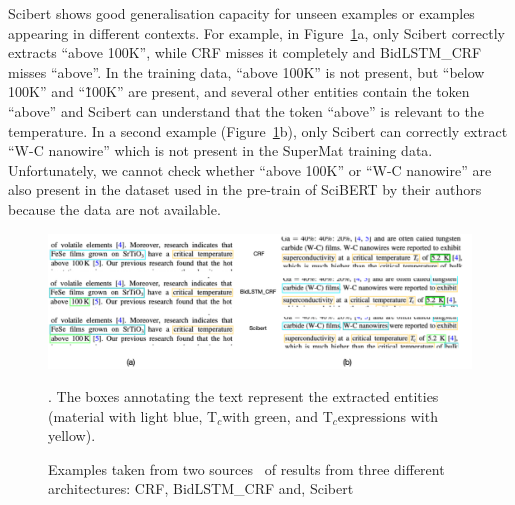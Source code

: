 \documentclass[]{interact}
\theoremstyle{plain}%
\theoremstyle{definition}
\theoremstyle{remark}
\newcommand{\tc}{T$_{c}$}
\begin{document}
Scibert shows good generalisation capacity for unseen examples or examples appearing in different contexts.
For example, in Figure~\ref{fig:example-comparison-architectures}a, only Scibert correctly extracts ``above 100K'', while CRF misses it completely and BidLSTM\_CRF misses ``above''.
In the training data, ``above 100K'' is not present, but ``below 100K'' and ``\~100K'' are present, and several other entities contain the token ``above'' and Scibert can understand that the token ``above'' is relevant to the temperature.
In a second example (Figure~\ref{fig:example-comparison-architectures}b), only Scibert can correctly extract ``W-C nanowire'' which is not present in the SuperMat training data.
Unfortunately, we cannot check whether ``above 100K'' or ``W-C nanowire'' are also present in the dataset used in the pre-train of SciBERT by their authors~\cite{Beltagy2019SciBERT} because the data are not available.

\begin{figure}[ht]
    \centering
    \includegraphics[width=\textwidth]{example-comparison-archs.png}
    \caption{Examples taken from two sources~\cite{Gajda_2016, Shibata_2016} of results from three different architectures: CRF, BidLSTM\_CRF and, Scibert}. The boxes annotating the text represent the extracted entities (material with light blue, \tc with green, and \tc expressions with yellow).
    \label{fig:example-comparison-architectures}
\end{figure}
\end{document}
